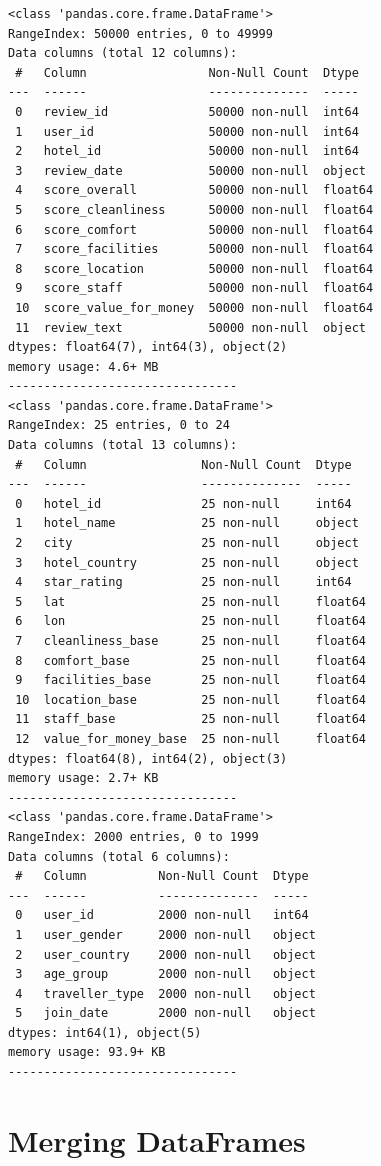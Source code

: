 \documentclass[
  letterpaper,
  DIV=11,
  numbers=noendperiod]{scrartcl}
\begin{document}
\begin{verbatim}
<class 'pandas.core.frame.DataFrame'>
RangeIndex: 50000 entries, 0 to 49999
Data columns (total 12 columns):
 #   Column                 Non-Null Count  Dtype  
---  ------                 --------------  -----  
 0   review_id              50000 non-null  int64  
 1   user_id                50000 non-null  int64  
 2   hotel_id               50000 non-null  int64  
 3   review_date            50000 non-null  object 
 4   score_overall          50000 non-null  float64
 5   score_cleanliness      50000 non-null  float64
 6   score_comfort          50000 non-null  float64
 7   score_facilities       50000 non-null  float64
 8   score_location         50000 non-null  float64
 9   score_staff            50000 non-null  float64
 10  score_value_for_money  50000 non-null  float64
 11  review_text            50000 non-null  object 
dtypes: float64(7), int64(3), object(2)
memory usage: 4.6+ MB
--------------------------------
<class 'pandas.core.frame.DataFrame'>
RangeIndex: 25 entries, 0 to 24
Data columns (total 13 columns):
 #   Column                Non-Null Count  Dtype  
---  ------                --------------  -----  
 0   hotel_id              25 non-null     int64  
 1   hotel_name            25 non-null     object 
 2   city                  25 non-null     object 
 3   hotel_country         25 non-null     object 
 4   star_rating           25 non-null     int64  
 5   lat                   25 non-null     float64
 6   lon                   25 non-null     float64
 7   cleanliness_base      25 non-null     float64
 8   comfort_base          25 non-null     float64
 9   facilities_base       25 non-null     float64
 10  location_base         25 non-null     float64
 11  staff_base            25 non-null     float64
 12  value_for_money_base  25 non-null     float64
dtypes: float64(8), int64(2), object(3)
memory usage: 2.7+ KB
--------------------------------
<class 'pandas.core.frame.DataFrame'>
RangeIndex: 2000 entries, 0 to 1999
Data columns (total 6 columns):
 #   Column          Non-Null Count  Dtype 
---  ------          --------------  ----- 
 0   user_id         2000 non-null   int64 
 1   user_gender     2000 non-null   object
 2   user_country    2000 non-null   object
 3   age_group       2000 non-null   object
 4   traveller_type  2000 non-null   object
 5   join_date       2000 non-null   object
dtypes: int64(1), object(5)
memory usage: 93.9+ KB
--------------------------------
\end{verbatim}

\section{Merging DataFrames}\label{merging-dataframes}
\end{document}
